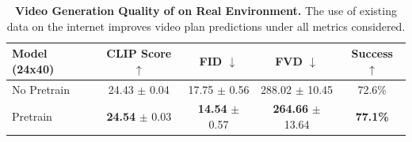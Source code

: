 \begin{table}[t!]
\small\setlength{\tabcolsep}{5.5pt}
\centering
\begin{tabular}{lcccc}
      {\bf Model (24x40)} & {\bf CLIP Score} $\uparrow$ & {\bf FID} $\downarrow$ & {\bf FVD} $\downarrow$ & {\bf Success} $\uparrow$ \\
      \midrule
      No Pretrain & 24.43 $\pm$ 0.04 & 17.75 $\pm$ 0.56 & 288.02 $\pm$ 10.45 & 72.6\% \\
      Pretrain & \textbf{24.54} $\pm$ 0.03 & \textbf{14.54} $\pm$ 0.57 & \textbf{264.66} $\pm$ 13.64 & \textbf{77.1\%} \\
    \bottomrule
\end{tabular}
\vspace{2pt}
\caption{\small \textbf{Video Generation Quality of \model on Real Environment.} The use of existing data on the internet improves video plan predictions under all metrics considered.}
\label{tbl:real}
\vspace{-15pt}
\end{table}